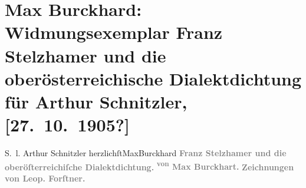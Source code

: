 

         
         \renewcommand{\erwaehntePersonen}{Personen: Leopold Forstner}
         \renewcommand{\erwaehnteInstitutionen}{Institutionen: Wiener Verlag}
         \renewcommand{\erwaehnteOrte}{Orte: Leipzig, Wien}
         \renewcommand{\erwaehnteWerke}{Werke: Börsenblatt für den Deutschen Buchhandel, Charakterbilder aus Oberösterreich, Franz Stelzhamer und die oberösterreichische Dialektdichtung}
               \section[Max Burckhard: Widmungsexemplar Franz Stelzhamer und die oberösterreichische Dialektdichtung für Arthur Schnitzler, {[}27. 10. 1905?{]}]{ Max Burckhard: Widmungsexemplar Franz Stelzhamer und die
                    oberösterreichische Dialektdichtung für Arthur Schnitzler, {[}27. 10. 1905?{]}}\nopagebreak{}\rehead{ }\begin{ledgroupsized}[t]{13cm}\normalsize\beginnumbering \toendnotes[C]{\smallbreak\pagebreak[2]} 
\toendnotes[C]{\smallbreak}\pstart
           \noindent{}{\pb}S. l. Arthur Schnitzler\pend
           \pstart herzlichſt\spacefill\mbox{MaxBurckhard}\pend{}{\bigskip}\pstart
           \noindent{}\centering{}{\pb}\textcolor{gray}{\textbf{Franz Stelzhamer und die oberöſterreichiſche
                            Dialektdichtung.}}\pend
           \pstart
           \noindent{}\centering{}\textcolor{gray}{\textbf{\textsuperscript{von} Max Burckhart.}}\pend
           \pstart
           \noindent{}\centering{}\textcolor{gray}{\textbf{Zeichnungen von Leop.
                            Forſtner.}}\pend
           {\bigskip}\pstart
           \noindent{}\centering{}\textcolor{gray}{\textbf{\label{K_L01566_1v}}}
\end{ledgroupsized}
